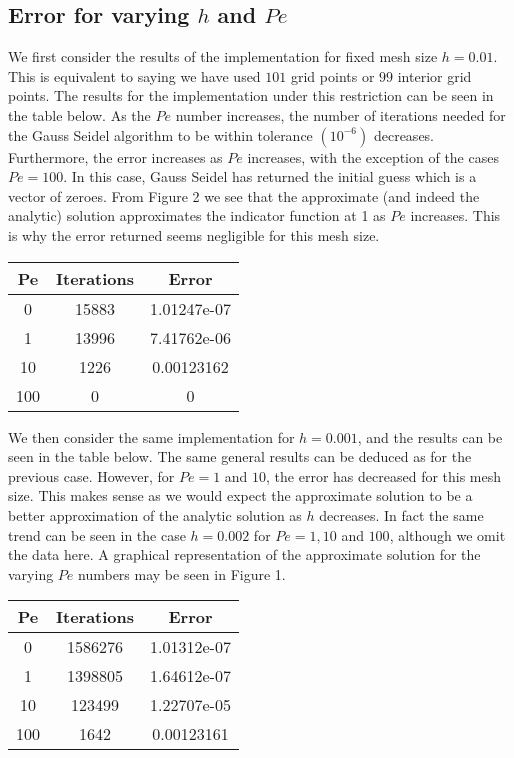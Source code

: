 \documentclass[10pt]{article}
\begin{document}
\subsection{Error for varying $h$ and $Pe$}
We first consider the results of the implementation for fixed mesh size $h = 0.01$. This is equivalent to saying we have used $101$ grid points or $99$ interior grid points. The results for the implementation under this restriction can be seen in the table below. As the $Pe$ number increases, the number of iterations needed for the Gauss Seidel algorithm to be within tolerance $( 10^{-6} )$ decreases. Furthermore, the error increases as $Pe$ increases, with the exception of the cases $Pe =100$. In this case, Gauss Seidel has returned the initial guess which is a vector of zeroes. From Figure 2 we see that the approximate (and indeed the analytic) solution approximates the indicator function at 1 as $Pe$ increases. This is why the error returned seems negligible for this mesh size.
\begin{center}
 \begin{tabular}{||c c c ||}
 \hline
 Pe & Iterations & Error \\ [0.5ex]
 \hline\hline
 0 & 15883 & 1.01247e-07  \\
 \hline
 1 & 13996 & 7.41762e-06   \\
 \hline
 10 & 1226 & 0.00123162  \\
 \hline
 100 & 0 & 0 \\
 \hline
\end{tabular}
\end{center}

We then consider the same implementation for $h = 0.001$, and the results can be seen in the table below. The same general results can be deduced as for the previous case. However, for $Pe =1$ and $10$, the error has decreased for this mesh size. This makes sense as we would expect the approximate solution to be a better approximation of the analytic solution as $h$ decreases. In fact the same trend can be seen in the case $h=0.002$ for $Pe = 1,10$ and $100$, although we omit the data here. A graphical representation of the approximate solution for the varying $Pe$ numbers may be seen in Figure 1.
\begin{center}
 \begin{tabular}{||c c c ||}
 \hline
 Pe & Iterations & Error \\ [0.5ex]
 \hline\hline
 0 & 1586276 & 1.01312e-07  \\
 \hline
 1 & 1398805 & 1.64612e-07   \\
 \hline
 10 & 123499 & 1.22707e-05  \\
 \hline
 100 & 1642 & 0.00123161 \\
 \hline
\end{tabular}
\end{center}
\end{document}
